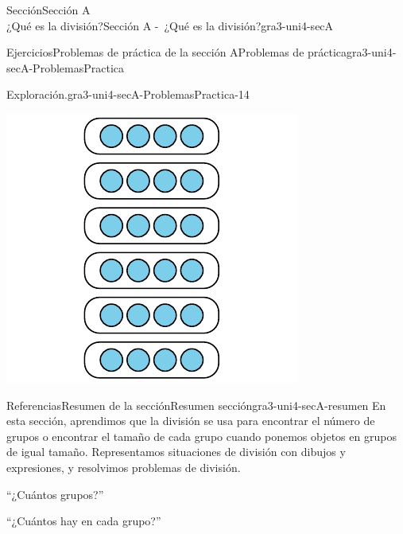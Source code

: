 \begin{sectionptx}{Sección}{{\Large Sección A\\}¿Qué es la división?}{}{Sección A -~¿Qué es la división?}{}{}{gra3-uni4-secA}
\begin{exercises-subsection}{Ejercicios}{Problemas de práctica de la sección A}{}{Problemas de práctica}{}{}{gra3-uni4-secA-ProblemasPractica}
\begin{divisionexercise}{12}{Exploración.}{}{gra3-uni4-secA-ProblemasPractica-14}
\begin{sidebyside}{3}{0}{0}{0.02}
\begin{sbspanel}{0.32}
\includegraphics[max width=\linewidth, center]{external/svg-source/tikz-file-151676.pdf}
\end{sbspanel}%
\end{sidebyside}%
\end{divisionexercise}%
\end{exercises-subsection}
%
%
\typeout{************************************************}
\typeout{************************************************}
%
\begin{references-subsection}{Referencias}{Resumen de la sección}{}{Resumen sección}{}{}{gra3-uni4-secA-resumen}
En esta sección, aprendimos que la división se usa para encontrar el número de grupos o encontrar el tamaño de cada grupo cuando ponemos objetos en grupos de igual tamaño. Representamos situaciones de división con dibujos y expresiones, y resolvimos problemas de división.%
\begin{sidebyside}{2}{0.025}{0.025}{0.05}%
\begin{sbspanel}{0.45}%
``¿Cuántos grupos?''%
\end{sbspanel}%
\begin{sbspanel}{0.45}%
\par
``¿Cuántos hay en cada grupo?''%
\end{sbspanel}%
\end{sidebyside}%
\begin{sidebyside}{2}{0.025}{0.025}{0.05}%

\end{sidebyside}
\end{references-subsection}
\end{sectionptx}
